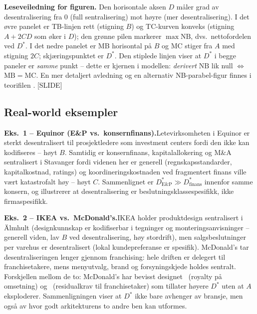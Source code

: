 \textbf{Leseveiledning for figuren.} Den horisontale aksen $D$ måler grad av desentralisering fra 0 (full sentralisering) mot høyre (mer desentralisering). I det øvre panelet er TB-linjen rett (stigning $B$) og TC-kurven konveks (stigning $A + 2CD$ som øker i $D$); den grønne pilen markerer $\max\mathrm{NB}$, dvs.\ nettofordelen ved $D^{*}$. I det nedre panelet er MB horisontal på $B$ og MC stiger fra $A$ med stigning $2C$; skjæringspunktet er $D^{*}$. Den stiplede linjen viser at $D^{*}$ i begge paneler er \emph{samme} punkt -- dette er kjernen i modellen: \emph{derivert} $\mathrm{NB}$ lik null $\Leftrightarrow$ $\mathrm{MB} = \mathrm{MC}$. En mer detaljert avledning og en alternativ NB-parabel-figur finnes i teorifilen . [SLIDE]

\subsection*{Real-world eksempler}

\textbf{Eks.\ 1 -- Equinor (E\&P vs.\ konsernfinans).}\quad [EKS]
Letevirksomheten i Equinor er sterkt desentralisert til prosjektledere som investment centers fordi den  ikke kan kodifiseres -- høyt $B$. Samtidig er konsernfinans, kapitalallokering og M\&A sentralisert i Stavanger fordi videnen her er generell (regnskapsstandarder, kapitalkostnad, ratings) og koordineringskostnaden ved fragmentert finans ville vært katastrofalt høy -- høyt $C$. Sammenlignet er $D^{*}_{\text{E\&P}} \gg D^{*}_{\text{finans}}$ innenfor samme konsern, og illustrerer at desentralisering er beslutningsklassespesifikk, ikke firmaspesifikk.

\textbf{Eks.\ 2 -- IKEA vs.\ McDonald's.}\quad [EKS]
IKEA holder produktdesign sentralisert i \"Almhult (designkunnskap er kodifiserbar i tegninger og monteringsanvisninger -- generell viden, lav $B$ ved desentralisering, høy stordrift), men salgsbeslutninger per varehus er desentralisert (lokal kundepreferanse er spesifik). McDonald's tar desentraliseringen lenger gjennom franchising: hele driften er delegert til franchisetakere, mens menyutvalg, brand og forsyningskjede holdes sentralt. Forskjellen mellom de to: McDonald's har bevisst designet \STwo\ (royalty på omsetning) og \SThree\ (residualkrav til franchisetaker) som tillater høyere $D^{*}$ uten at $A$ eksploderer. Sammenligningen viser at $D^{*}$ ikke bare avhenger av bransje, men også av hvor godt arkitekturens to andre ben kan utformes.

